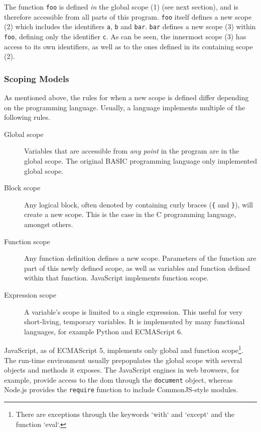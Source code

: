 The function \texttt{foo} is defined \emph{in} the global scope (1) (see
next section), and is therefore accessible from all parts of this
program. \texttt{foo} itself defines a new scope (2) which includes the
identifiers \texttt{a}, \texttt{b} and \texttt{bar}. \texttt{bar}
defines a new scope (3) within \texttt{foo}, defining only the
identifier \texttt{c}. As can be seen, the innermost scope (3) has
access to its own identifiers, as well as to the ones defined in its
containing scope (2).

\subsubsection{Scoping Models}\label{scoping-models}

As mentioned above, the rules for when a new scope is defined differ
depending on the programming language. Usually, a language implements
multiple of the following rules.

\begin{description}
\item[Global scope]
Variables that are accessible from \emph{any point} in the program are
in the global scope. The original BASIC programming language only
implemented global scope.
\item[Block scope]
Any logical block, often denoted by containing curly braces (\texttt{\{}
and \texttt{\}}), will create a new scope. This is the case in the C
programming language, amongst others.
\item[Function scope]
Any function definition defines a new scope. Parameters of the function
are part of this newly defined scope, as well as variables and function
defined within that function. JavaScript implements function scope.
\item[Expression scope]
A variable’s scope is limited to a single expression. This useful for
very short-living, temporary variables. It is implemented by many
functional languages, for example Python and ECMAScript 6.
\end{description}

JavaScript, as of ECMAScript 5, implements only global and function
scope\footnote{There are exceptions through the keywords `with` and `except` and the function `eval`.}.
The run-time environment usually prepopulates the global scope with
several objects and methods it exposes. The JavaScript engines in web
browsers, for example, provide access to the \ac{dom} through the
\texttt{document} object, whereas Node.js provides the \texttt{require}
function to include CommonJS-style modules.

